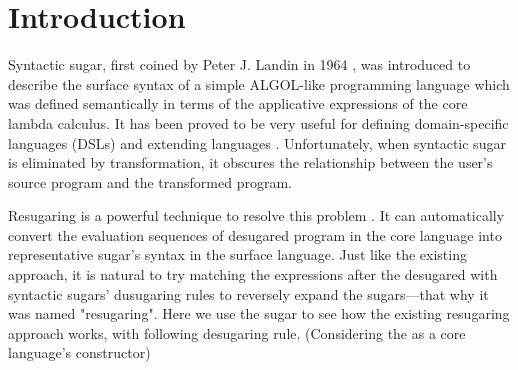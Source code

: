 \section{Introduction}









Syntactic sugar, first coined by Peter J. Landin in 1964 \cite{syntacticsugar}, was introduced to describe the surface syntax of a simple ALGOL-like programming language which was defined semantically in terms of the applicative expressions of the core lambda calculus. It has been proved to be very useful for defining domain-specific languages (DSLs) and extending languages \cite{FellFFKBMT18,CulpFFK19}.
Unfortunately, when syntactic sugar is eliminated by transformation, it obscures the relationship between the user’s source program and the transformed program.



Resugaring is a powerful technique to resolve this problem \cite{resugaring,hygienic}. It  can automatically convert the evaluation sequences of desugared program in the core language into representative sugar's syntax in the surface language. Just like the existing approach, it is natural to try matching the expressions after the desugared with syntactic sugars' dusugaring rules to reversely expand the sugars---that why it was named "resugaring". Here we use the sugar  to see how the existing resugaring approach works, with following desugaring rule. (Considering the  as a core language's constructor)

